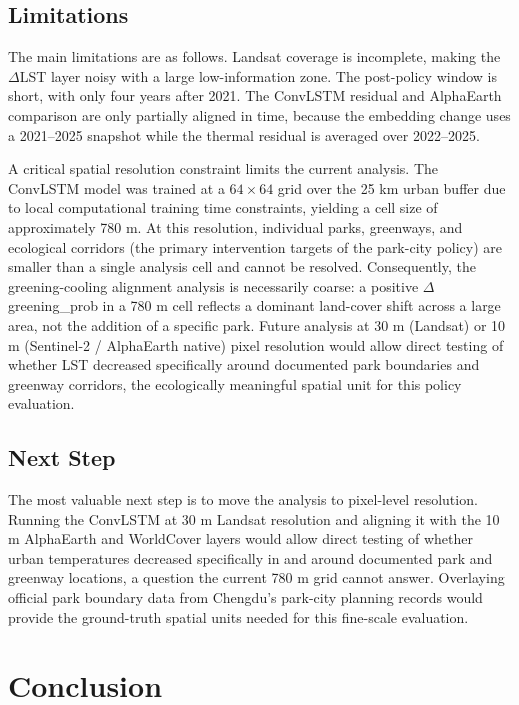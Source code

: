 \documentclass{article}
\begin{document}
\subsection{Limitations}

The main limitations are as follows. Landsat coverage is incomplete, making the
$\Delta$LST layer noisy with a large low-information zone. The post-policy
window is short, with only four years after 2021. The ConvLSTM residual and
AlphaEarth comparison are only partially aligned in time, because the embedding
change uses a 2021--2025 snapshot while the thermal residual is averaged over
2022--2025.

A critical spatial resolution constraint limits the current analysis. The
ConvLSTM model was trained at a $64 \times 64$ grid over the 25 km urban
buffer due to local computational training time constraints, yielding a cell
size of approximately 780 m. At this resolution, individual parks, greenways,
and ecological corridors (the primary intervention targets of the park-city
policy) are smaller than a single analysis cell and cannot be resolved.
Consequently, the greening-cooling alignment analysis is necessarily coarse:
a positive $\Delta$greening\_prob in a 780 m cell reflects a dominant land-cover
shift across a large area, not the addition of a specific park. Future analysis
at 30 m (Landsat) or 10 m (Sentinel-2 / AlphaEarth native) pixel resolution
would allow direct testing of whether LST decreased specifically around
documented park boundaries and greenway corridors, the ecologically
meaningful spatial unit for this policy evaluation.

\subsection{Next Step}

The most valuable next step is to move the analysis to pixel-level resolution.
Running the ConvLSTM at 30 m Landsat resolution and aligning it with the 10 m
AlphaEarth and WorldCover layers would allow direct testing of whether urban
temperatures decreased specifically in and around documented park and greenway
locations, a question the current 780 m grid cannot answer. Overlaying
official park boundary data from Chengdu's park-city planning records would
provide the ground-truth spatial units needed for this fine-scale evaluation.

\section{Conclusion}
\label{sec:conclusion}
\end{document}
